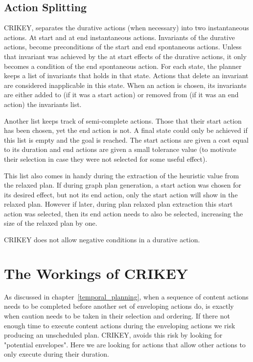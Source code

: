 \documentclass
[a4paper
,english
,parskip=half
,bibliography=totoc
]{scrreprt}
\begin{document}
    \subsection{Action Splitting} \label{split}
    CRIKEY, separates the durative actions (when necessary) into two instantaneous actions.
    At start and at end instantaneous actions.
    Invariants of the durative actions, become preconditions of the start and end spontaneous actions. Unless that invariant was achieved by the at start effects of the durative actions, it only becomes a condition of the end spontaneous action. For each state, the planner keeps a list of invariants that holds in that state. Actions that delete an invariant are considered inapplicable in this state. When an action is chosen, its invariants are either added to (if it was a start action) or removed from (if it was an end action) the invariants list.

    Another list keeps track of semi-complete actions. Those that their start action has been chosen, yet the end action is not. A final state could only be achieved if this list is empty and the goal is reached. The start actions are given a cost equal to its duration and end actions are given a small tolerance value (to motivate their selection in case they were not selected for some useful effect).

    This list also comes in handy during the extraction of the heuristic value from the relaxed plan. If during graph plan generation, a start action was chosen for its desired effect, but not its end action, only the start action will show in the relaxed plan. However if later, during plan relaxed plan extraction this start action was selected, then its end action needs to also be selected, increasing the size of the relaxed plan by one.

    CRIKEY does not allow negative conditions in a durative action.

    \section{The Workings of CRIKEY} \label{workings}
    As discussed in chapter~\ref{temporal_planning}, when a sequence of content actions needs to be completed before another set of enveloping actions do, is exactly when caution needs to be taken in their selection and ordering. If there not enough time to execute content actions during the enveloping actions we risk producing an unscheduled plan. CRIKEY, avoids this risk by looking for "potential envelopes". Here we are looking for actions that allow other actions to only execute during their duration.
\end{document}
